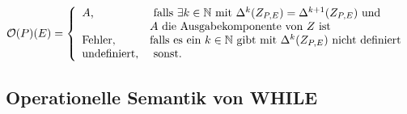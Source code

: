 $\mathcal{O}(P)(E)=\left\lbrace\begin{array}{l l} A\text{,}&\text{ falls }\exists k\in\mathbb{N} \text{ mit } \Delta^k(Z_{P,E}) =\Delta^{k+1}(Z_{P,E})\text{ und }\\&A\text{ die Ausgabekomponente von }Z\text{ ist}\\
\text{Fehler,}& \text{falls es ein }k\in\mathbb{N}\text{ gibt mit }\Delta^k(Z_{P,E}) \text{ nicht definiert}\\
\text{undefiniert,}&\text{ sonst.}\\
\end{array}\right.$

\subsection{Operationelle Semantik von WHILE}
